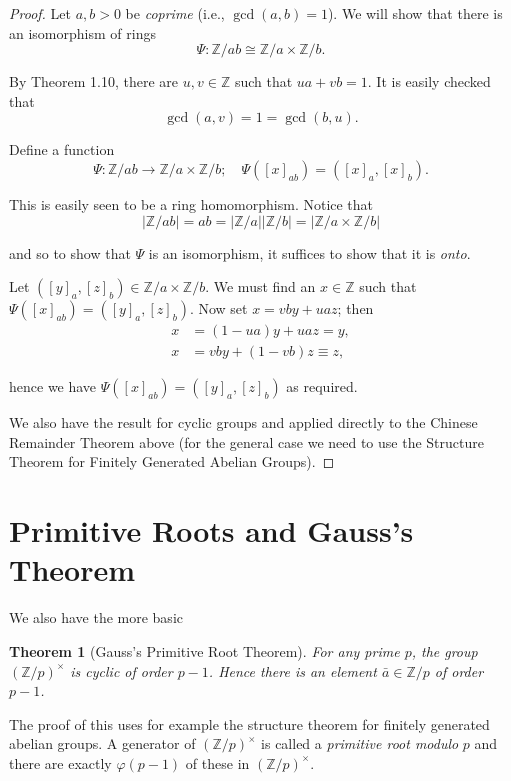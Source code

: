 \documentclass[11pt]{book}
\theoremstyle{plain}
\newtheorem{theorem}{Theorem}[chapter]
\theoremstyle{definition}
\begin{document}
\begin{proof}
Let $a, b > 0$ be \emph{coprime} (i.e., $\gcd(a,b) = 1$). We will show that there is an isomorphism of rings
\[
\Psi : \mathbb{Z}/ab \cong \mathbb{Z}/a \times \mathbb{Z}/b.
\]

By Theorem 1.10, there are $u, v \in \mathbb{Z}$ such that $ua + vb = 1$. It is easily checked that
\[
\gcd(a, v) = 1 = \gcd(b, u).
\]

Define a function
\[
\Psi : \mathbb{Z}/ab \longrightarrow \mathbb{Z}/a \times \mathbb{Z}/b; \quad \Psi([x]_{ab}) = ([x]_a, [x]_b).
\]

This is easily seen to be a ring homomorphism. Notice that
\[
|\mathbb{Z}/ab| = ab = |\mathbb{Z}/a| |\mathbb{Z}/b| = |\mathbb{Z}/a \times \mathbb{Z}/b|
\]

and so to show that $\Psi$ is an isomorphism, it suffices to show that it is \emph{onto}.

Let $([y]_a, [z]_b) \in \mathbb{Z}/a \times \mathbb{Z}/b$. We must find an $x \in \mathbb{Z}$ such that $\Psi([x]_{ab}) = ([y]_a, [z]_b)$. Now set $x = vby + uaz$; then
\begin{align*}
x &= (1 - ua)y + uaz = y, \\
x &= vby + (1 - vb)z \equiv z,
\end{align*}

hence we have $\Psi([x]_{ab}) = ([y]_a, [z]_b)$ as required.

We also have the result for cyclic groups and applied directly to the Chinese Remainder Theorem above (for the general case we need to use the Structure Theorem for Finitely Generated Abelian Groups).
\end{proof}

\section{Primitive Roots and Gauss's Theorem}

We also have the more basic

\begin{theorem}[Gauss's Primitive Root Theorem]
For any prime $p$, the group $(\mathbb{Z}/p)^{\times}$ is cyclic of order $p - 1$. Hence there is an element $\bar{a} \in \mathbb{Z}/p$ of order $p - 1$.
\end{theorem}

The proof of this uses for example the structure theorem for finitely generated abelian groups. A generator of $(\mathbb{Z}/p)^{\times}$ is called a \emph{primitive root modulo} $p$ and there are exactly $\varphi(p - 1)$ of these in $(\mathbb{Z}/p)^{\times}$.
\end{document}
